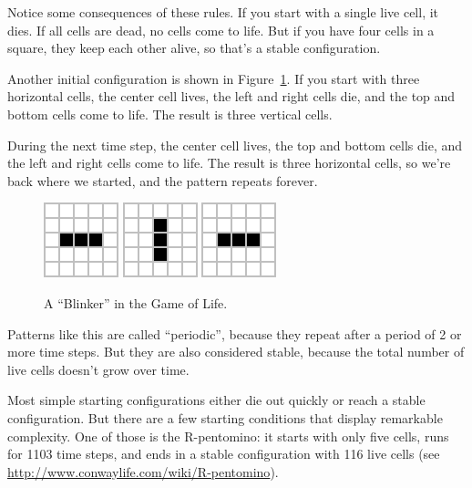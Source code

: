 
Notice some consequences of these rules.
If you start with a single live cell, it dies.
If all cells are dead, no cells come to life.
But if you have four cells in a square, they keep each other alive, so that's a stable configuration.

Another initial configuration is shown in Figure~\ref{fig:blinker}.
If you start with three horizontal cells, the center cell lives, the left and right cells die, and the top and bottom cells come to life.
The result is three vertical cells.

During the next time step, the center cell lives, the top and bottom cells die, and the left and right cells come to life.
The result is three horizontal cells, so we're back where we started, and the pattern repeats forever.

\begin{figure}[!ht]
\begin{center}
\includegraphics{figs/blinker-0.png}
\raisebox{38pt}{~$\longrightarrow$~}
\includegraphics{figs/blinker-1.png}
\raisebox{38pt}{~$\longrightarrow$~}
\includegraphics{figs/blinker-0.png}
\raisebox{38pt}{~$\longrightarrow$~ \ldots}
\caption{A ``Blinker'' in the Game of Life.}
\label{fig:blinker}
\end{center}
\end{figure}

Patterns like this are called ``periodic'', because they repeat after a period of 2 or more time steps.
But they are also considered stable, because the total number of live cells doesn't grow over time.

Most simple starting configurations either die out quickly or reach a stable configuration.
But there are a few starting conditions that display remarkable complexity.
One of those is the R-pentomino: it starts with only five cells, runs for 1103 time steps, and ends in a stable configuration with 116 live cells (see \url{http://www.conwaylife.com/wiki/R-pentomino}).

